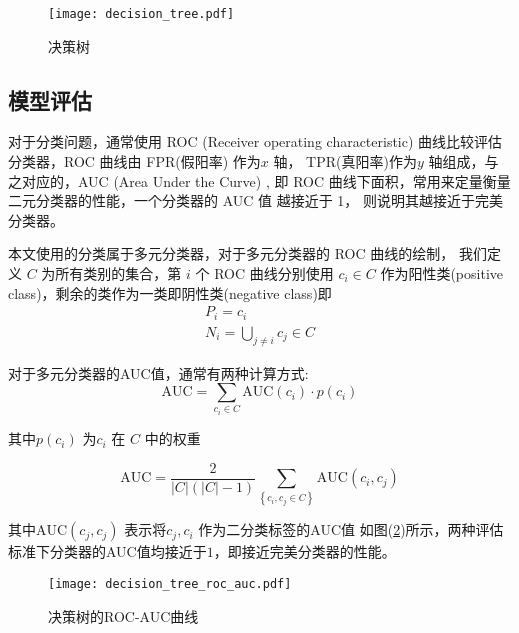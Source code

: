 \documentclass[withoutpreface,bwprint]{cumcmthesis} %
\begin{document}
\begin{figure}[!h]
    \centering
    \texttt{[image: decision\_tree.pdf]}
    \caption{决策树}
    \label{fig:decision_tree}
\end{figure}





\subsection{模型评估}
对于分类问题，通常使用 ROC (Receiver operating characteristic) \cite{fawcett2006introduction}
曲线比较评估分类器，ROC 曲线由 FPR(假阳率) 作为$x$ 轴，
TPR(真阳率)作为$y$ 轴组成，与之对应的，AUC (Area Under the Curve) \cite{fawcett2006introduction},
即 ROC 曲线下面积，常用来定量衡量二元分类器的性能，一个分类器的 AUC 值
越接近于 1， 则说明其越接近于完美分类器。

本文使用的分类属于多元分类器，对于多元分类器的 ROC 曲线的绘制，
我们定义 $C$ 为所有类别的集合，第 $i$ 个 ROC 曲线分别使用 $c_i \in C$
作为阳性类(positive class)，剩余的类作为一类即阴性类(negative class)即
\begin{gather}
    P_i = c_i  \\
    N_i = \bigcup_{j \neq i} c_j \in C
\end{gather}

对于多元分类器的AUC值，通常有两种计算方式:
\begin{equation}
    \text{AUC} = \sum_{c_i \in C} \text{AUC}(c_i) \cdot p(c_i)
\end{equation}

其中$p(c_i)$ 为$c_i$ 在 $C$ 中的权重

\begin{equation}
    \text{AUC} = \dfrac{2}{\left | C \right |\left ( \left | C \right |-1  \right )}\sum_{\left \{ c_{i},c_{j}\in C \right \} }\text{AUC}\left ( c_{i},c_{j} \right )
\end{equation}

其中$\text{AUC}(c_j, c_j)$ 表示将$c_j, c_i$ 作为二分类标签的AUC值
如图(\ref{fig:decision_tree_roc_auc})所示，两种评估标准下分类器的AUC值均接近于$1$，即接近完美分类器的性能。

\begin{figure}[!h]
    \centering
    \texttt{[image: decision\_tree\_roc\_auc.pdf]}
    \caption{决策树的ROC-AUC曲线}
    \label{fig:decision_tree_roc_auc} 
\end{figure}
\end{document}
